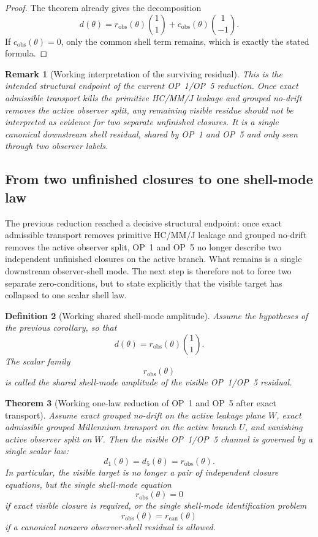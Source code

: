 \documentclass[12pt,a4paper]{article}
\newtheorem{theorem}{Theorem}[section]
\newtheorem{definition}[theorem]{Definition}
\newtheorem{remark}[theorem]{Remark}
\begin{document}
\begin{proof}
The theorem already gives the decomposition
\[
 d(\theta)=r_{\mathrm{obs}}(\theta)\binom{1}{1}+c_{\mathrm{obs}}(\theta)\binom{1}{-1}.
\]
If $c_{\mathrm{obs}}(\theta)=0$, only the common shell term remains, which is exactly the stated formula.
\end{proof}

\begin{remark}[Working interpretation of the surviving residual]
This is the intended structural endpoint of the current OP~1/OP~5 reduction. Once exact admissible transport kills the primitive HC/MM/J leakage and grouped no-drift removes the active observer split, any remaining visible residue should not be interpreted as evidence for two separate unfinished closures. It is a single canonical downstream shell residual, shared by OP~1 and OP~5 and only seen through two observer labels.
\end{remark}


\subsection*{From two unfinished closures to one shell-mode law}
The previous reduction reached a decisive structural endpoint: once exact admissible transport removes primitive HC/MM/J leakage and grouped no-drift removes the active observer split, OP~1 and OP~5 no longer describe two independent unfinished closures on the active branch. What remains is a single downstream observer-shell mode. The next step is therefore not to force two separate zero-conditions, but to state explicitly that the visible target has collapsed to one scalar shell law.

\begin{definition}[Working shared shell-mode amplitude]
Assume the hypotheses of the previous corollary, so that
\[
 d(\theta)=r_{\mathrm{obs}}(\theta)\binom{1}{1}.
\]
The scalar family
\[
 r_{\mathrm{obs}}(\theta)
\]
is called the shared shell-mode amplitude of the visible OP~1/OP~5 residual.
\end{definition}

\begin{theorem}[Working one-law reduction of OP~1 and OP~5 after exact transport]
Assume exact grouped no-drift on the active leakage plane $W$, exact admissible grouped Millennium transport on the active branch $U$, and vanishing active observer split on $W$. Then the visible OP~1/OP~5 channel is governed by a single scalar law:
\[
 d_1(\theta)=d_5(\theta)=r_{\mathrm{obs}}(\theta).
\]
In particular, the visible target is no longer a pair of independent closure equations, but the single shell-mode equation
\[
 r_{\mathrm{obs}}(\theta)=0
\]
if exact visible closure is required, or the single shell-mode identification problem
\[
 r_{\mathrm{obs}}(\theta)=r_{\mathrm{can}}(\theta)
\]
if a canonical nonzero observer-shell residual is allowed.
\end{theorem}
\end{document}
